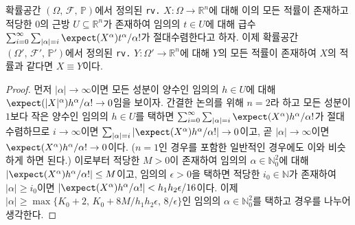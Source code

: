 \begin{theorem}
    확률공간 $(\Omega,\,\mathcal{F},\,\mathbb{P})$에서 정의된 \texttt{rv.} $X:\Omega\to\mathbb{R}^n$에 대해 이의 모든 적률이 존재하고 적당한 $0$의 근방 $U\subseteq\mathbb{R}^n$가 존재하여 임의의 $t\in U$에 대해 급수 $\sum_{i=0}^\infty\sum_{|\alpha|=i}\expect(X^\alpha)t^\alpha/\alpha!$가 절대수렴한다고 하자. 이제 확률공간 $(\Omega',\,\mathcal{F}',\,\mathbb{P}')$에서 정의된 \texttt{rv.} $Y:\Omega'\to\mathbb{R}^n$에 대해 $Y$의 모든 적률이 존재하여 $X$의 적률과 같다면 $X\equiv Y$이다.
\end{theorem}

\begin{proof}
    먼저 $|\alpha|\to\infty$이면 모든 성분이 양수인 임의의 $h\in U$에 대해 $\expect(|X|^\alpha)h^\alpha/\alpha!\to0$임을 보이자. 간결한 논의를 위해 $n=2$라 하고 모든 성분이 $1$보다 작은 양수인 임의의 $h\in U$를 택하면 $\sum_{i=0}^\infty\sum_{|\alpha|=i}\expect(X^\alpha)h^\alpha/\alpha!$가 절대수렴하므로 $i\to\infty$이면 $\sum_{|\alpha|=i}|\expect(X^\alpha)h^\alpha/\alpha!|\to0$이고, 곧 $|\alpha|\to\infty$이면 $\expect(X^\alpha)h^\alpha/\alpha!\to0$이다. ($n=1$인 경우를 포함한 일반적인 경우에도 이와 비슷하게 하면 된다.) 이로부터 적당한 $M>0$이 존재하여 임의의 $\alpha\in\mathbb{N}_0^2$에 대해 $|\expect(X^\alpha)h^\alpha/\alpha!|\leq M$이고, 임의의 $\epsilon>0$을 택하면 적당한 $i_0\in\mathbb{N}$가 존재하여 $|\alpha|\geq i_0$이면 $|\expect(X^\alpha)h^\alpha/\alpha!|<h_1h_2\epsilon/16$이다. 이제 $|\alpha|\geq \max\{K_0+2,\,K_0+8M/h_1h_2\epsilon,\,8/\epsilon\}$인 임의의 $\alpha\in\mathbb{N}_0^2$를 택하고 경우를 나누어 생각한다.
    

\end{proof}
